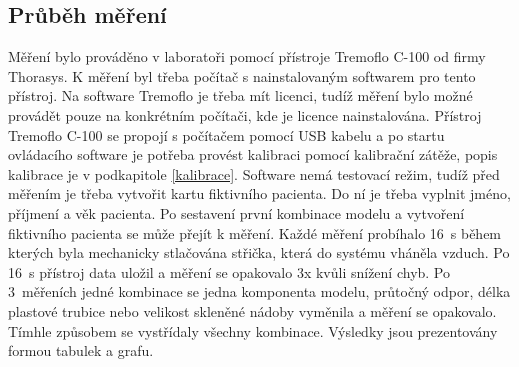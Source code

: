 \subsection{Průběh měření}
Měření bylo prováděno v laboratoři pomocí přístroje Tremoflo C-100 od firmy Thorasys. K měření byl třeba počítač s nainstalovaným softwarem pro tento přístroj. Na software Tremoflo je třeba mít licenci, tudíž měření bylo možné provádět pouze na konkrétním počítači, kde je licence nainstalována. Přístroj Tremoflo C-100 se propojí s počítačem pomocí USB kabelu a po startu ovládacího software je potřeba provést kalibraci pomocí kalibrační zátěže, popis kalibrace je v podkapitole \ref{kalibrace}. Software nemá testovací režim, tudíž před měřením je třeba vytvořit kartu fiktivního pacienta. Do ní je třeba vyplnit  jméno, příjmení a věk pacienta. Po sestavení první kombinace modelu a vytvoření fiktivního pacienta se může přejít k měření. Každé měření probíhalo  \SI{16}{s} během kterých byla mechanicky stlačována střička, která do systému vháněla vzduch. Po  \SI{16}{s} přístroj data uložil a měření se opakovalo 3x kvůli snížení chyb. Po 3~měřeních jedné kombinace se jedna komponenta modelu, průtočný odpor, délka plastové trubice nebo velikost skleněné nádoby vyměnila a měření se opakovalo. Tímhle způsobem se vystřídaly všechny kombinace. Výsledky jsou prezentovány formou tabulek a grafu. 
